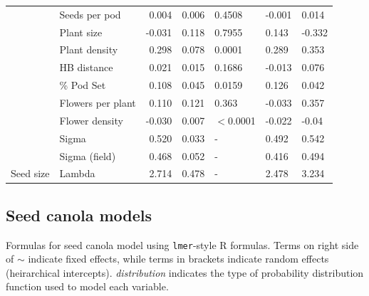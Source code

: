 \documentclass[12pt]{article} %
\begin{document}
\begin{longtable}{l|l|r|r|l|l|l}
\cline{2-7}
 & Seeds per pod & 0.004 & 0.006 & 0.4508 & -0.001 & 0.014\\
\cline{2-7}
 & Plant size & -0.031 & 0.118 & 0.7955 & 0.143 & -0.332\\
\cline{2-7}
 & Plant density & 0.298 & 0.078 & 0.0001 & 0.289 & 0.353\\
\cline{2-7}
 & HB distance & 0.021 & 0.015 & 0.1686 & -0.013 & 0.076\\
\cline{2-7}
 & \% Pod Set & 0.108 & 0.045 & 0.0159 & 0.126 & 0.042\\
\cline{2-7}
 & Flowers per plant & 0.110 & 0.121 & 0.363 & -0.033 & 0.357\\
\cline{2-7}
 & Flower density & -0.030 & 0.007 & $<$0.0001 & -0.022 & -0.04\\
\cline{2-7}
 & Sigma & 0.520 & 0.033 & - & 0.492 & 0.542\\
\cline{2-7}
 & Sigma (field) & 0.468 & 0.052 & - & 0.416 & 0.494\\
\cline{2-7}
\multirow{-12}{*}{\raggedright\arraybackslash Seed size} & Lambda & 2.714 & 0.478 & - & 2.478 & 3.234\\
\hline
\end{longtable}
\endgroup{}

\clearpage

\subsection*{Seed canola models}

Formulas for seed canola model using \texttt{lmer}-style R formulas. Terms on right side of $\sim$ indicate fixed effects, while terms in brackets indicate random effects (heirarchical intercepts). \textit{distribution} indicates the type of probability distribution function used to model each variable.
\end{document}
